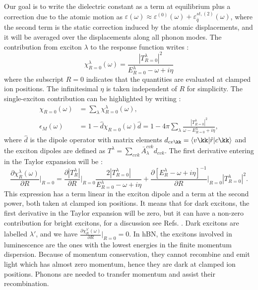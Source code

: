 Our goal is to write the dielectric constant as a term at equilibrium plus a correction due to the atomic motion as $\varepsilon (\omega)\approx \varepsilon^{(0)}(\omega) + \varepsilon^{st,(2)}_{\bar{q}}(\omega)$, where the second term is the static correction induced by the atomic displacements, and it will be averaged over the displacements along all phonon modes.\cite{zacharias2016one} 
The contribution from exciton $\lambda$ to the response function  writes :
\begin{equation}
	\chi^\lambda_{R=0}(\omega) = \frac{|T^\lambda_{R=0}|^2}{E^\lambda_{R=0} - \omega + i \eta} \label{eq:chi_R_lambda}
\end{equation}
where the subscript $R=0$ indicates that the quantities are evaluated at clamped ion positions. The infinitesimal $\eta$ is taken independent of $R$ for simplicity.
The single-exciton contribution can be highlighted by writing :
\begin{align}
	\chi_{R=0}(\omega)&= \sum_\lambda \chi^\lambda_{R=0} (\omega),  \label{eq:chi} \\
\epsilon_M(\omega)&=1 -  \hat d \chi_{R=0}(\omega) \hat d = 1 - 4\pi\sum_\lambda \frac{ | T_{R=0}^\lambda|^2}{\omega - E^\lambda_{R=0} + i\eta},
\end{align}
where $\hat{d}$ is the dipole operator with matrix elements $d_{cv\kk} = \langle v \kk | \hat r | c\kk \rangle$ and the exciton dipoles are defined as $T^\lambda = \sum_{cvk} \bar{A}_\lambda^{cvk} d_{cvk}$. The first derivative entering in the Taylor expansion will be :
\begin{equation}
	\frac{\partial \chi^\lambda_R(\omega)}{\partial R}\biggr|_{R=0} = \frac{\partial |T^\lambda_R|}{\partial R}\biggr|_{R=0} \frac{2|T^\lambda_{R=0}|}{E^\lambda_{R=0} - \omega + i\eta} + \frac{\partial \left[ E^\lambda_R - \omega + i\eta \right]^{-1}}{\partial R}\biggr|_{R=0} |T^\lambda_{R=0}|^2.
\end{equation}
This expression has a term linear in the exciton dipole and a term at the second power, both taken at clamped ion positions. It means that for dark excitons, the first derivative in the Taylor expansion will be zero, but it can have a non-zero contribution for bright excitons, for a discussion see Refs. \cite{zacharias2016one,zacharias2015stochastic}. Dark excitons are labelled $\lambda'$, and we have $\frac{\partial \chi^{\lambda'}_R(\omega)}{\partial R}\bigr|_{R=0} = 0$.
In \acrshort{hBN}, the excitons involved in luminescence are the ones with the lowest energies in the finite momentum dispersion. Because of momentum conservation, they cannot recombine and emit light which has almost zero momentum, hence they are dark at clamped ion positions. Phonons are needed to transfer momentum and assist their recombination. 

